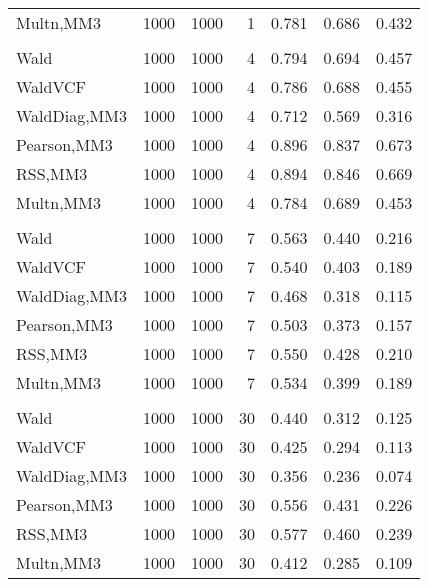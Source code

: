 \documentclass[
]{article}
\begin{document}
\begin{table}[H]
{\begin{tabular}[t]{lrrrrrr}
\hspace{1em}Multn,MM3 & 1000 & 1000 & 1 & 0.781 & 0.686 & 0.432\\
\addlinespace[0.3em]
\multicolumn{7}{l}{\textbf{1F 15V}}\\
\hspace{1em}Wald & 1000 & 1000 & 4 & 0.794 & 0.694 & 0.457\\
\hspace{1em}WaldVCF & 1000 & 1000 & 4 & 0.786 & 0.688 & 0.455\\
\hspace{1em}WaldDiag,MM3 & 1000 & 1000 & 4 & 0.712 & 0.569 & 0.316\\
\hspace{1em}Pearson,MM3 & 1000 & 1000 & 4 & 0.896 & 0.837 & 0.673\\
\hspace{1em}RSS,MM3 & 1000 & 1000 & 4 & 0.894 & 0.846 & 0.669\\
\hspace{1em}Multn,MM3 & 1000 & 1000 & 4 & 0.784 & 0.689 & 0.453\\
\addlinespace[0.3em]
\multicolumn{7}{l}{\textbf{2F 10V}}\\
\hspace{1em}Wald & 1000 & 1000 & 7 & 0.563 & 0.440 & 0.216\\
\hspace{1em}WaldVCF & 1000 & 1000 & 7 & 0.540 & 0.403 & 0.189\\
\hspace{1em}WaldDiag,MM3 & 1000 & 1000 & 7 & 0.468 & 0.318 & 0.115\\
\hspace{1em}Pearson,MM3 & 1000 & 1000 & 7 & 0.503 & 0.373 & 0.157\\
\hspace{1em}RSS,MM3 & 1000 & 1000 & 7 & 0.550 & 0.428 & 0.210\\
\hspace{1em}Multn,MM3 & 1000 & 1000 & 7 & 0.534 & 0.399 & 0.189\\
\addlinespace[0.3em]
\multicolumn{7}{l}{\textbf{3F 15V}}\\
\hspace{1em}Wald & 1000 & 1000 & 30 & 0.440 & 0.312 & 0.125\\
\hspace{1em}WaldVCF & 1000 & 1000 & 30 & 0.425 & 0.294 & 0.113\\
\hspace{1em}WaldDiag,MM3 & 1000 & 1000 & 30 & 0.356 & 0.236 & 0.074\\
\hspace{1em}Pearson,MM3 & 1000 & 1000 & 30 & 0.556 & 0.431 & 0.226\\
\hspace{1em}RSS,MM3 & 1000 & 1000 & 30 & 0.577 & 0.460 & 0.239\\
\hspace{1em}Multn,MM3 & 1000 & 1000 & 30 & 0.412 & 0.285 & 0.109\\
\bottomrule
\end{tabular}}
\endgroup{}
\end{table}
\end{document}
